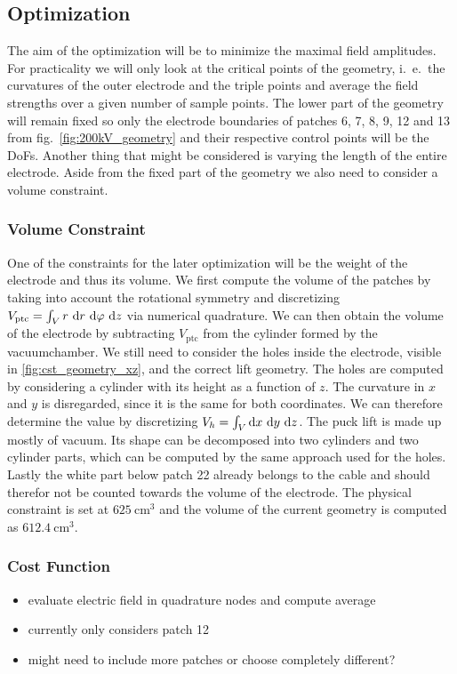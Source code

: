 \subsection{Optimization}
The aim of the optimization will be to minimize the maximal field amplitudes. For practicality we will only look at the critical points of the geometry, i.~e.~the curvatures of the outer electrode and the triple points and average the field strengths over a given number of sample points. The lower part of the geometry will remain fixed so only the electrode boundaries of patches 6, 7, 8, 9, 12 and 13 from fig.~\ref{fig:200kV_geometry} and their respective control points will be the DoFs. Another thing that might be considered is varying the length of the entire electrode. Aside from the fixed part of the geometry we also need to consider a volume constraint.

\subsubsection{Volume Constraint}
One of the constraints for the later optimization will be the weight of the electrode and thus its volume.
We first compute the volume of the patches by taking into account the rotational symmetry and discretizing $V_{\mathrm{ptc}} = \int_V r\ \mathrm{d} r\ \mathrm{d} \varphi\ \mathrm{d} z$ via numerical quadrature. We can then obtain the volume of the electrode by subtracting $V_{\mathrm{ptc}}$ from the cylinder formed by the vacuumchamber.
We still need to consider the holes inside the electrode, visible in \ref{fig:cst_geometry_xz}, and the correct lift geometry. The holes are computed by considering a cylinder with its height as a function of $z$. The curvature in $x$ and $y$ is disregarded, since it is the same for both coordinates. We can therefore determine the value by discretizing $V_{h} = \int_V \mathrm{d} x\ \mathrm{d} y\ \mathrm{d} z$.
The puck lift is made up mostly of vacuum. Its shape can be decomposed into two cylinders and two cylinder parts, which can be computed by the same approach used for the holes.
Lastly the white part below patch 22 already belongs to the cable and should therefor not be counted towards the volume of the electrode.
The physical constraint is set at $625\ \mathrm{cm}^3$ and the volume of the current geometry is computed as $612.4\ \mathrm{cm}^3$.

\subsubsection{Cost Function}
\begin{itemize}
   \item evaluate electric field in quadrature nodes and compute average
   \item currently only considers patch 12
   \item might need to include more patches or choose completely different?
\end{itemize}

